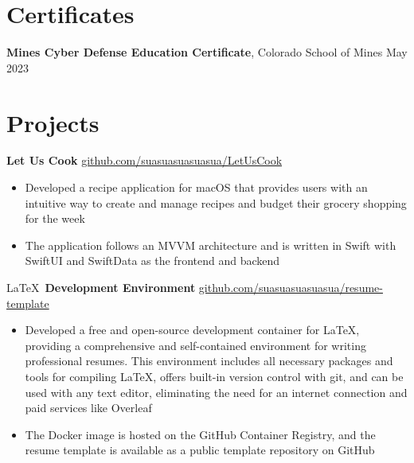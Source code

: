 \documentclass[11pt]{article}       %
\begin{document}
\vspace{-18.5pt}

\section*{Certificates}
\textbf{Mines Cyber Defense Education Certificate}, {Colorado School of Mines} \hfill May 2023 \\

\vspace{-6.5pt}

\section*{Projects}
\textbf{Let Us Cook} \hfill \href{https://github.com/suasuasuasuasua/LetUsCook}{github.com/suasuasuasuasua/LetUsCook} \\
\vspace{-9pt}
\begin{itemize}
  \item Developed a recipe application for macOS that provides users with an
        intuitive way to create and manage recipes and budget their grocery shopping
        for the week
  \item The application follows an MVVM architecture and is written in Swift
        with SwiftUI and SwiftData as the frontend and backend
\end{itemize}

\LaTeX \, \textbf{Development Environment} \hfill
\href{https://github.com/suasuasuasuasua/resume-template}{github.com/suasuasuasuasua/resume-template}
\\
\vspace{-9pt}
\begin{itemize}
  \item Developed a free and open-source development container for \LaTeX,
        providing a comprehensive and self-contained environment for writing
        professional resumes. This environment includes all necessary packages
        and tools for compiling \LaTeX, offers built-in version control with
        git, and can be used with any text editor, eliminating the need for an
        internet connection and paid services like Overleaf
  \item The Docker image is hosted on the
        GitHub Container Registry, and the resume template is available as a
        public template repository on GitHub
\end{itemize}
\end{document}
